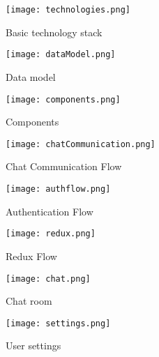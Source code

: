 \newpage
{}


\begin{figure}[!ht]
	\begin{center}
		\texttt{[image: technologies.png]}
		\caption{Basic technology stack}
		\label{technologies}
	\end{center}
\end{figure}

\begin{figure}[!ht]
	\begin{center}
		\texttt{[image: dataModel.png]}
		\caption{Data model}
		\label{dataModel}
	\end{center}
\end{figure}

\begin{figure}[!ht]
	\begin{center}
		\texttt{[image: components.png]}
		\caption{Components}
		\label{components}
	\end{center}
\end{figure}

\begin{figure}[!ht]
	\begin{center}
		\texttt{[image: chatCommunication.png]}
		\caption{Chat Communication Flow}
		\label{chatCommunication}
	\end{center}
\end{figure}

\begin{figure}[!ht]
	\begin{center}
		\texttt{[image: authflow.png]}
		\caption{Authentication Flow}
		\label{authflow}
	\end{center}
\end{figure}

\begin{figure}[!ht]
	\begin{center}
		\texttt{[image: redux.png]}
		\caption{Redux Flow}
		\label{redux}
	\end{center}
\end{figure}

\begin{figure}[!ht]
	\begin{center}
		\texttt{[image: chat.png]}
		\caption{Chat room}
		\label{chat}
	\end{center}
\end{figure}

\begin{figure}[!ht]
	\begin{center}
		\texttt{[image: settings.png]}
		\caption{User settings}
		\label{settings}
	\end{center}
\end{figure}



